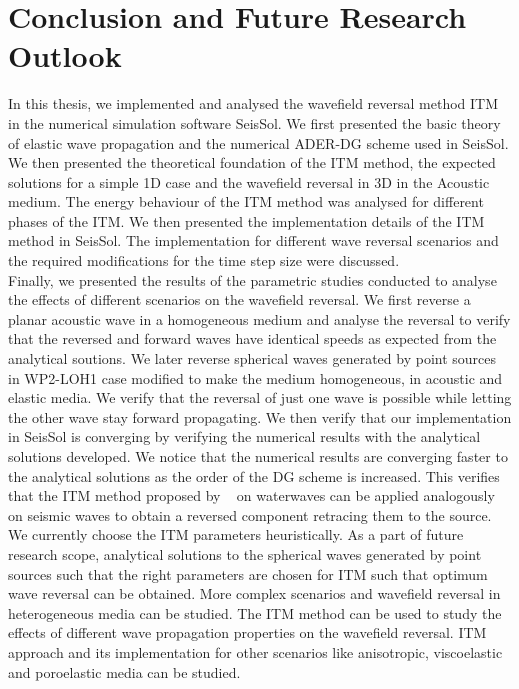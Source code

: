 \chapter{Conclusion and Future Research Outlook}\label{chapter:Conclusion}
In this thesis, we implemented and analysed the wavefield reversal method \ac{ITM} in the numerical simulation software SeisSol. We first presented the basic theory of elastic wave propagation and the numerical \ac{ADER}-\ac{DG} scheme used in SeisSol.
We then presented the theoretical foundation of the \ac{ITM} method, the expected solutions for a simple 1D case and the wavefield reversal in 3D in the Acoustic medium.
The energy behaviour of the \ac{ITM} method was analysed for different phases of the \ac{ITM}.
We then presented the implementation details of the \ac{ITM} method in SeisSol. The implementation for different wave reversal scenarios and the required modifications for the time step size were discussed. \\

Finally, we presented the results of the parametric studies conducted to analyse the effects of different scenarios on the wavefield reversal.
We first reverse a planar acoustic wave in a homogeneous medium and analyse the reversal to verify that the reversed and forward waves have identical speeds as expected from the analytical soutions.
We later reverse spherical waves generated by point sources in WP2-LOH1 case modified to make the medium homogeneous, in acoustic and elastic media. We verify that the reversal of just one wave is possible while letting 
the other wave stay forward propagating. We then verify that our implementation in SeisSol is converging by verifying the numerical results with the analytical solutions developed. We notice that
the numerical results are converging faster to the analytical solutions as the order of the \ac{DG} scheme is increased. This verifies that the \ac{ITM}
method proposed by ~\parencite{Bacot2016} on waterwaves can be applied analogously on seismic waves to obtain a reversed component retracing them to the source. \\

We currently choose the \ac{ITM} parameters heuristically. As a part of future research scope, analytical solutions to the spherical waves generated by point sources such that the right parameters are chosen for \ac{ITM} such that 
optimum wave reversal can be obtained. More complex scenarios and wavefield reversal in heterogeneous media can be studied. 
The \ac{ITM} method can be used to study the effects of different wave propagation properties on the wavefield reversal. \ac{ITM} approach and its implementation 
for other scenarios like anisotropic, viscoelastic and poroelastic media can be studied. \\
